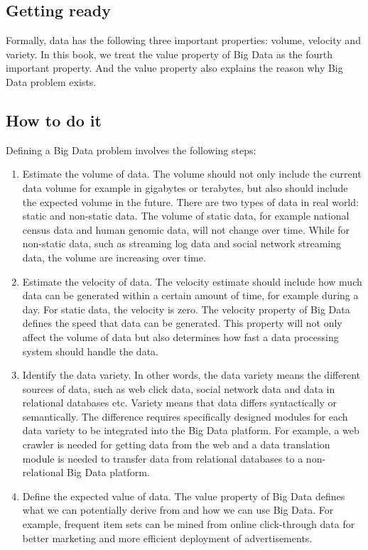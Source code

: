 \subsection*{Getting ready}
Formally, data has the following three important properties: volume, velocity and variety. In this book, we treat the value property of Big Data as the fourth important property. And the value property also explains the reason why Big Data problem exists.

\subsection*{How to do it}
Defining a Big Data problem involves the following steps:
\begin{enumerate}
  \item Estimate the volume of data. The volume should not only include the current data volume for example in gigabytes or terabytes, but also should include the expected volume in the future. There are two types of data in real world: static and non-static data. The volume of static data, for example national census data and human genomic data, will not change over time. While for non-static data, such as streaming log data and social network streaming data, the volume are increasing over time.
  \item Estimate the velocity of data. The velocity estimate should include how much data can be generated within a certain amount of time, for example during a day. For static data, the velocity is zero. The velocity property of Big Data defines the speed that data can be generated. This property will not only affect the volume of data but also determines how fast a data processing system should handle the data.
  \item Identify the data variety. In other words, the data variety means the different sources of data, such as web click data, social network data and data in relational databases etc. Variety means that data differs syntactically or semantically. The difference requires specifically designed modules for each data variety to be integrated into the Big Data platform. For example, a web crawler is needed for getting data from the web and a data translation module is needed to transfer data from relational databases to a non-relational Big Data platform.
  \item Define the expected value of data. The value property of Big Data defines what we can potentially derive from and how we can use Big Data. For example, frequent item sets can be mined from online click-through data for better marketing and more efficient deployment of advertisements.
\end{enumerate}

